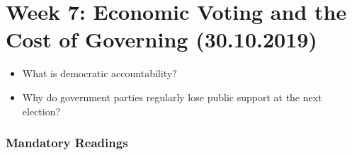 \documentclass[abstract=on,parskip=full,headings=standardclasses,fontsize=11pt,paper=a4]{scrartcl}
\begin{document}

\section{Week 7: Economic Voting and the Cost of Governing (30.10.2019)}


\begin{itemize}
\renewcommand\labelitemi{--}
\item What is democratic accountability?
\item Why do government parties  regularly lose public support at the next election?
\end{itemize}

\subsubsection*{Mandatory Readings}
\end{document}
